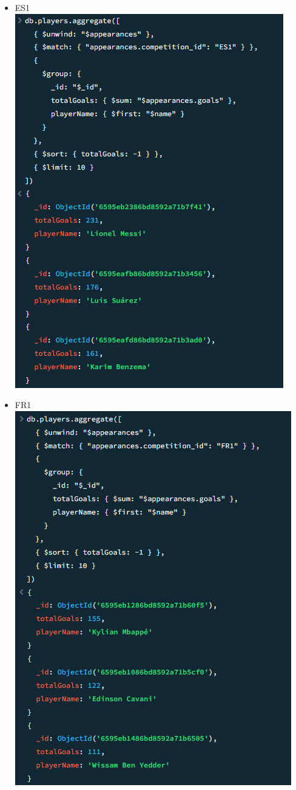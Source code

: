 \documentclass{Configuration_Files/PoliMi3i_thesis}
\begin{document}
\begin{itemize}
    \item ES1\\
    \includegraphics[scale=0.8]{Images/Queries/Competitions_statistics/top_goalscorers/ES1.png}
    \item FR1\\
    \includegraphics[scale=0.8]{Images/Queries/Competitions_statistics/top_goalscorers/FR1.png}

\end{itemize}
\end{document}
